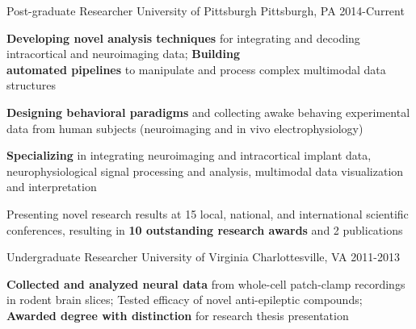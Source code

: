 \vspace*{-0.25cm}

\vspace*{0.3cm}

\begin{cventries}

\cventry
    {Post-graduate Researcher} %
    {University of Pittsburgh} %
    {Pittsburgh, PA} %
    {2014-Current} %
    {
      \begin{cvitems} %
        \item {\textbf{Developing novel analysis techniques} for integrating and decoding intracortical and neuroimaging data; \textbf{Building \\ automated pipelines} to manipulate and process complex multimodal data structures}
        \item {\textbf{Designing behavioral paradigms} and collecting awake behaving experimental data from human subjects (neuroimaging and in vivo electrophysiology)}
		\item {\textbf{Specializing} in integrating neuroimaging and intracortical implant data, neurophysiological signal processing and analysis, multimodal data visualization and interpretation}        
        \item {Presenting novel research results at 15 local, national, and international scientific conferences, resulting in \textbf{10 outstanding research awards} and 2 publications}
      \end{cvitems}
    }
    \vspace*{0.2cm}
    
\cventry
    {Undergraduate Researcher}%
    {University of Virginia}
    {Charlottesville, VA} %
    {2011-2013} %
    {
      \begin{cvitems}
      	\item {\textbf{Collected and analyzed neural data} from whole-cell patch-clamp recordings in rodent brain slices; Tested efficacy of novel anti-epileptic compounds; \textbf{Awarded degree with distinction} for research thesis presentation}
      \end{cvitems}
    }
    \vspace*{0.2cm}


\end{cventries}
